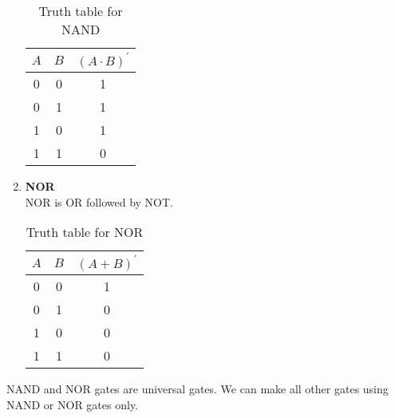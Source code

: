 \documentclass[oneside]{book}
\begin{document}
\begin{enumerate}
\begin{table}[ht]
\begin{tabular}{|cc|c|}
			      \hline
			      $A$ & $B$ & $(A\cdot B)^\prime$ \\
			      \hline
			      0   & 0   & 1                   \\
			      0   & 1   & 1                   \\
			      1   & 0   & 1                   \\
			      1   & 1   & 0                   \\
			      \hline
		      \end{tabular}
		      \caption{Truth table for NAND}
		      \label{truth_table_for_nand}
	      \end{table}
	\item \textbf{NOR}\\
	      NOR is OR followed by NOT.
	      \begin{table}[ht]
		      \centering
		      \begin{tabular}{|cc|c|}
			      \hline
			      $A$ & $B$ & $(A+ B)^\prime$ \\
			      \hline
			      0   & 0   & 1               \\
			      0   & 1   & 0               \\
			      1   & 0   & 0               \\
			      1   & 1   & 0               \\
			      \hline
		      \end{tabular}
		      \caption{Truth table for NOR}
		      \label{truth_table_for_nor}
	      \end{table}
\end{enumerate}

\noindent NAND and NOR gates are universal gates. We can make all other gates using NAND or NOR gates only.



\end{document}
